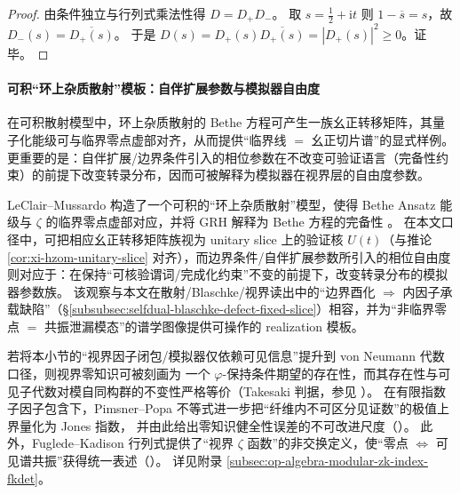\begin{proof}
由条件独立与行列式乘法性得 \(D=D_{+}D_{-}\)。
取 \(s=\tfrac12+\mathrm{i}t\) 则 \(1-\overline{s}=s\)，故
\(
D_{-}(s)=\overline{D_{+}(s)}
\)。
于是 \(D(s)=D_{+}(s)\overline{D_{+}(s)}=|D_{+}(s)|^{2}\ge 0\)。证毕。
\end{proof}

\paragraph{可积“环上杂质散射”模板：自伴扩展参数与模拟器自由度}
在可积散射模型中，环上杂质散射的 Bethe 方程可产生一族幺正转移矩阵，其量子化能级可与临界零点虚部对齐，从而提供“临界线 \(=\) 幺正切片谱”的显式样例。
更重要的是：自伴扩展/边界条件引入的相位参数在不改变可验证语言（完备性约束）的前提下改变转录分布，因而可被解释为模拟器在视界层的自由度参数。

\begin{remark}\label{rem:xi-hzom-impurity-scattering-simulator-freedom}
LeClair--Mussardo 构造了一个可积的“环上杂质散射”模型，使得 Bethe Ansatz 能级与 \(\zeta\) 的临界零点虚部对应，并将 GRH 解释为 Bethe 方程的完备性 \cite{LeClairMussardo2024RiemannZerosImpurities}。
在本文口径中，可把相应幺正转移矩阵族视为 unitary slice 上的验证核 \(U(t)\)（与推论 \ref{cor:xi-hzom-unitary-slice} 对齐），而边界条件/自伴扩展参数所引入的相位自由度则对应于：在保持“可核验谓词/完成化约束”不变的前提下，改变转录分布的模拟器参数族。
该观察与本文在散射/Blaschke/视界读出中的“边界酉化 \(\Rightarrow\) 内因子承载缺陷”（\S\ref{subsubsec:selfdual-blaschke-defect-fixed-slice}）相容，并为“非临界零点 \(=\) 共振泄漏模态”的谱学图像提供可操作的 realization 模板。
\end{remark}

\begin{remark}\label{rem:xi-hzom-opalgebra-takesaki-index-fkdet}
若将本小节的“视界因子闭包/模拟器仅依赖可见信息”提升到 von Neumann 代数口径，则视界零知识可被刻画为
一个 \(\varphi\)-保持条件期望的存在性，而其存在性与可见子代数对模自同构群的不变性严格等价（Takesaki 判据，参见 \cite{AccardiCecchini1982ConditionalExpectationsTakesaki,Takesaki1972ConditionalExpectationsVNA}）。
在有限指数子因子包含下，Pimsner--Popa 不等式进一步把“纤维内不可区分见证数”的极值上界量化为 Jones 指数，
并由此给出零知识健全性误差的不可改进尺度（\cite{PimsnerPopa1986EntropyIndexSubfactors}）。
此外，Fuglede--Kadison 行列式提供了“视界 \(\zeta\) 函数”的非交换定义，使“零点 \(\Leftrightarrow\) 可见谱共振”获得统一表述（\cite{FugledeKadison1951DeterminantsTraceFiniteFactors}）。
详见附录 \ref{subsec:op-algebra-modular-zk-index-fkdet}。
\end{remark}

\endinput

